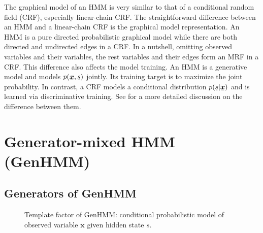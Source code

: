 \begin{remark}
The graphical model of an HMM is very similar to that of a conditional random field (CRF), especially linear-chain CRF. The straightforward difference between an HMM and a linear-chain CRF is the graphical model representation. An HMM is a pure directed probabilistic graphical model while there are both directed and undirected edges in a CRF. In a nutshell, omitting observed variables and their variables, the rest variables and their edges form an MRF in a CRF. This difference also affects the model training. An HMM is a generative model and models $p(\ubar{\bm{x}}, \ubar{{s}})$ jointly. Its training target is to maximize the joint probability. In contrast, a CRF models a conditional distribution $p(\ubar{{s}}|\ubar{\bm{x}})$ and is learned via discriminative training. See \cite{charles2012crf} for a more detailed discussion on the difference between them.
\end{remark}

\section{Generator-mixed HMM (GenHMM)}


\subsection{Generators of GenHMM}

\begin{figure}[!t]
  \centering
  \caption{Template factor of GenHMM: conditional probabilistic model of observed variable $\bm{x}$ given hidden state $s$.}
  \label{fig:gen-mix}
  \vspace{0.3cm}
\end{figure}

